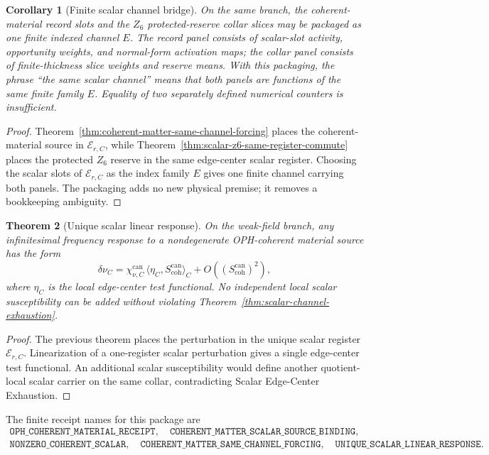 \documentclass[11pt]{article}
\newtheorem{theorem}{Theorem}[section]
\newtheorem{corollary}[theorem]{Corollary}
\theoremstyle{remark}
\theoremstyle{plain}
\begin{document}
\begin{corollary}[Finite scalar channel bridge]
\label{cor:finite-scalar-channel-bridge}
On the same branch, the coherent-material record slots and the \(Z_6\)
protected-reserve collar slices may be packaged as one finite indexed channel
\(E\).  The record panel consists of scalar-slot activity, opportunity weights,
and normal-form activation maps; the collar panel consists of finite-thickness
slice weights and reserve means.  With this packaging, the phrase ``the same
scalar channel'' means that both panels are functions of the same finite family
\(E\).  Equality of two separately defined numerical counters is insufficient.
\end{corollary}

\begin{proof}
Theorem~\ref{thm:coherent-matter-same-channel-forcing} places the
coherent-material source in \(\mathcal E_{r,C}\), while
Theorem~\ref{thm:scalar-z6-same-register-commute} places the protected
\(Z_6\) reserve in the same edge-center scalar register.  Choosing the scalar
slots of \(\mathcal E_{r,C}\) as the index family \(E\) gives one finite
channel carrying both panels.  The packaging adds no new physical premise; it
removes a bookkeeping ambiguity.
\end{proof}

\begin{theorem}[Unique scalar linear response]
\label{thm:unique-scalar-linear-response}
On the weak-field branch, any infinitesimal frequency response to a
nondegenerate OPH-coherent material source has the form
\[
  \delta \nu_C
  =
  \chi_{\nu,C}^{\mathrm{can}}\,
  \langle \eta_C,S_{\mathrm{coh}}^{\mathrm{can}}\rangle_C
  +O\!\left((S_{\mathrm{coh}}^{\mathrm{can}})^2\right),
\]
where \(\eta_C\) is the local edge-center test functional.  No independent local
scalar susceptibility can be added without violating
Theorem~\ref{thm:scalar-channel-exhaustion}.
\end{theorem}

\begin{proof}
The previous theorem places the perturbation in the unique scalar register
\(\mathcal E_{r,C}\).  Linearization of a one-register scalar perturbation gives a
single edge-center test functional.  An additional scalar susceptibility would
define another quotient-local scalar carrier on the same collar, contradicting
Scalar Edge-Center Exhaustion.
\end{proof}

\noindent The finite receipt names for this package are
\[
\begin{gathered}
\texttt{OPH\_COHERENT\_MATERIAL\_RECEIPT},\quad
\texttt{COHERENT\_MATTER\_SCALAR\_SOURCE\_BINDING},\\
\texttt{NONZERO\_COHERENT\_SCALAR},\quad
\texttt{COHERENT\_MATTER\_SAME\_CHANNEL\_FORCING},\quad
\texttt{UNIQUE\_SCALAR\_LINEAR\_RESPONSE}.
\end{gathered}
\]
\end{document}
